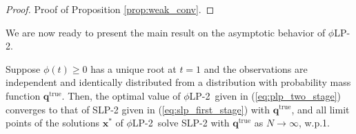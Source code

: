 \documentclass[opre,nonblindrev]{informs3} %
\renewcommand{\P}{\mathbb{P}}
\newcommand{\x}{\mathbf{x}}
\newcommand{\q}{\mathbf{q}}
\newcommand{\qtrue}{\q^{\text{true}}}
\newcommand{\plp}{$\phi$LP-2}
\begin{document}
\begin{proof}{\sc Proof of Proposition \ref{prop:weak_conv}.}
%	
	\Halmos
% 
%
%
%
%
%
\end{proof}

We are now ready to present the main result on the asymptotic behavior of \plp. 


\begin{theorem}
	\label{thm:epiconvergence}
	Suppose $\phi(t) \geq 0$ has a unique root at $t = 1$ and the observations are independent and identically distributed from a distribution with probability mass function $\qtrue$. 
	Then, the optimal value of \plp\ given in (\ref{eq:plp_two_stage}) converges to that of SLP-2 given in (\ref{eq:slp_first_stage}) with $\qtrue$, and all limit points of the solutions $\x^*$ of \plp\ solve SLP-2 with $\qtrue$ as $N \rightarrow \infty$, w.p.1.
\end{theorem}
\end{document}
